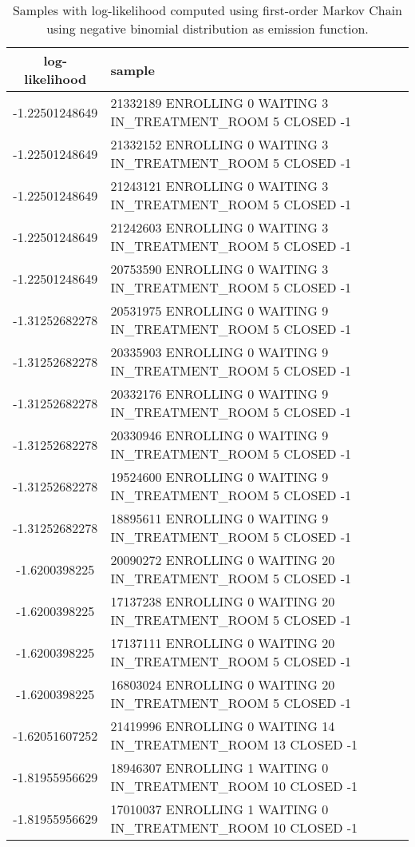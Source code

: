 \newpage
{\scriptsize
\begin{longtable}{|c|p{}|}
\caption{Samples with log-likelihood computed using first-order Markov Chain using negative binomial distribution as emission function.}
\label{tab:samplesFromGenerative}\\
\hline
log-likelihood & sample \\ \hline
-1.22501248649 & 21332189 ENROLLING 0 WAITING 3 IN\_TREATMENT\_ROOM 5 CLOSED -1 \\
-1.22501248649 & 21332152 ENROLLING 0 WAITING 3 IN\_TREATMENT\_ROOM 5 CLOSED -1 \\
-1.22501248649 & 21243121 ENROLLING 0 WAITING 3 IN\_TREATMENT\_ROOM 5 CLOSED -1 \\
-1.22501248649 & 21242603 ENROLLING 0 WAITING 3 IN\_TREATMENT\_ROOM 5 CLOSED -1 \\
-1.22501248649 & 20753590 ENROLLING 0 WAITING 3 IN\_TREATMENT\_ROOM 5 CLOSED -1 \\
\hline
-1.31252682278 & 20531975 ENROLLING 0 WAITING 9 IN\_TREATMENT\_ROOM 5 CLOSED -1 \\
-1.31252682278 & 20335903 ENROLLING 0 WAITING 9 IN\_TREATMENT\_ROOM 5 CLOSED -1 \\
-1.31252682278 & 20332176 ENROLLING 0 WAITING 9 IN\_TREATMENT\_ROOM 5 CLOSED -1 \\
-1.31252682278 & 20330946 ENROLLING 0 WAITING 9 IN\_TREATMENT\_ROOM 5 CLOSED -1 \\
-1.31252682278 & 19524600 ENROLLING 0 WAITING 9 IN\_TREATMENT\_ROOM 5 CLOSED -1 \\
-1.31252682278 & 18895611 ENROLLING 0 WAITING 9 IN\_TREATMENT\_ROOM 5 CLOSED -1 \\
\hline
-1.6200398225 & 20090272 ENROLLING 0 WAITING 20 IN\_TREATMENT\_ROOM 5 CLOSED -1 \\
-1.6200398225 & 17137238 ENROLLING 0 WAITING 20 IN\_TREATMENT\_ROOM 5 CLOSED -1 \\
-1.6200398225 & 17137111 ENROLLING 0 WAITING 20 IN\_TREATMENT\_ROOM 5 CLOSED -1 \\
-1.6200398225 & 16803024 ENROLLING 0 WAITING 20 IN\_TREATMENT\_ROOM 5 CLOSED -1 \\
-1.62051607252 & 21419996 ENROLLING 0 WAITING 14 IN\_TREATMENT\_ROOM 13 CLOSED -1 \\
\hline
-1.81955956629 & 18946307 ENROLLING 1 WAITING 0 IN\_TREATMENT\_ROOM 10 CLOSED -1 \\
-1.81955956629 & 17010037 ENROLLING 1 WAITING 0 IN\_TREATMENT\_ROOM 10 CLOSED -1 \\

\end{longtable}}
